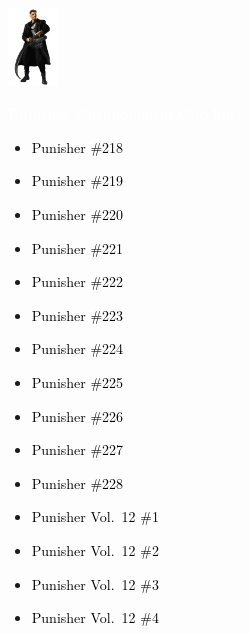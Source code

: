 \documentclass[12pt]{article}
\newcommand{\checkbox}{\raisebox{0.0ex}{\fbox{\rule{0ex}{1.5ex} \rule{1.5ex}{0ex}}}}
\begin{document}
\begin{center}
    \vspace*{2cm}
    \includegraphics[width=0.1\textwidth]{PUNISHER1.PNG}
    \vspace{0.3cm}

    {\Huge \textbf{\textcolor{white}{Punisher Chronological Checklist}}}
\end{center}

\vspace{0.3cm}
\noindent
\begin{tcolorbox}[
  colback=white!95!gray,
  colframe=black,
  width=\textwidth,
  arc=4mm,
  auto outer arc,
  boxrule=0.8pt,
  left=8pt,right=8pt,top=8pt,bottom=8pt
]
\begin{itemize}[left=0pt,label={\checkbox}]
    \item \textcolor{black}{Punisher \#218}
    \item \textcolor{black}{Punisher \#219}
    \item \textcolor{black}{Punisher \#220}
    \item \textcolor{black}{Punisher \#221}
    \item \textcolor{black}{Punisher \#222}
    \item \textcolor{black}{Punisher \#223}
    \item \textcolor{black}{Punisher \#224}
    \item \textcolor{black}{Punisher \#225}
    \item \textcolor{black}{Punisher \#226}
    \item \textcolor{black}{Punisher \#227}
    \item \textcolor{black}{Punisher \#228}
    \item \textcolor{black}{Punisher Vol.\ 12 \#1}
    \item \textcolor{black}{Punisher Vol.\ 12 \#2}
    \item \textcolor{black}{Punisher Vol.\ 12 \#3}
    \item \textcolor{black}{Punisher Vol.\ 12 \#4}
\end{itemize}
\end{tcolorbox}
\end{document}
